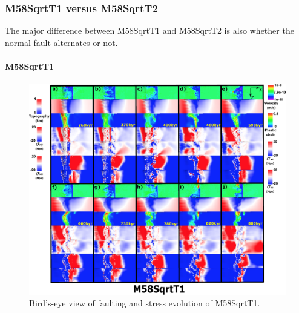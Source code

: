 \subsubsection{M58SqrtT1 versus M58SqrtT2}

The major difference between M58SqrtT1 and M58SqrtT2 is also whether the normal fault alternates or not.

\paragraph{M58SqrtT1}\label{para_M58SqrtT1}

\begin{figure}[h]
 \centering
  \includegraphics[width=1.0\textwidth]{./Figures/fig_Results_Weakening_7_M58SqrtT1_time_evolution.eps}
 \caption{Bird's-eye view of faulting and stress evolution of M58SqrtT1.}
\label{fig_Results_Weakenging_7}
\end{figure}

